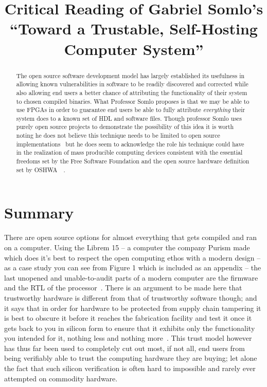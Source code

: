 \documentclass[conference]{IEEEtran}
\begin{document}
	
	\title{Critical Reading of Gabriel Somlo's ``Toward a Trustable, Self-Hosting Computer System''}
	
	\author{}
	
	\maketitle
	
	\begin{abstract}
		The open source software development model has largely established its usefulness in allowing known vulnerabilities in software to be readily discovered and corrected while also allowing end users a better chance of attributing the functionality of their system to chosen compiled binaries. What Professor Somlo proposes is that we may be able to use FPGAs in order to guarantee end users be able to fully attribute \textit{{everything}} their system does to a known set of HDL and software files. Though professor Somlo uses purely open source projects to demonstrate the possibility of this idea it is worth noting he does not believe this technique needs to be limited to open source implementations~\cite{Somlo} but he does seem to acknowledge the role his technique could have in the realization of mass producible computing devices consistent with the essential freedoms set by the Free Software Foundation and the open source hardware definition set by OSHWA~\cite{fsf}~\cite{oshwa}.
	\end{abstract}
	
	\section{Summary}
	There are open source options for almost everything that gets compiled and ran on a computer. Using the Librem 15 – a computer the company Purism made which does it’s best to respect the open computing ethos with a modern design – as a case study you can see from Figure 1 which is included as an appendix – the last unopened and unable-to-audit parts of a modern computer are the firmware and the RTL of the processor~\cite{bunnie}. There is an argument to be made here that trustworthy hardware is different from that of trustworthy software though; and it says that in order for hardware to be protected from supply chain tampering it is best to obscure it before it reaches the fabrication facility and test it once it gets back to you in silicon form to ensure that it exhibits only the functionality you intended for it, nothing less and nothing more~\cite{karri}. This trust model however has thus far been used to completely cut out most, if not all, end users from being verifiably able to trust the computing hardware they are buying; let alone the fact that such silicon verification is often hard to impossible and rarely ever attempted on commodity hardware.
	
\end{document}
